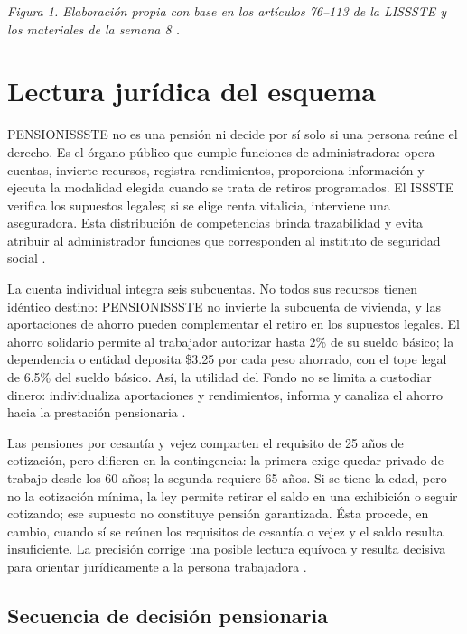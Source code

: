 \documentclass[11pt,letterpaper,oneside]{article}
\begin{document}
\begin{landscape}
\begin{center}
{\scriptsize\textit{Figura 1. Elaboración propia con base en los artículos 76--113 de la LISSSTE y los materiales de la semana 8 \citep{lissste2026,materialS8DSS2026}.}}
\end{center}
\end{landscape}
\restoregeometry
\clearpage

\section{Lectura jurídica del esquema}

PENSIONISSSTE no es una pensión ni decide por sí solo si una persona reúne el derecho. Es el órgano público que cumple funciones de administradora: opera cuentas, invierte recursos, registra rendimientos, proporciona información y ejecuta la modalidad elegida cuando se trata de retiros programados. El ISSSTE verifica los supuestos legales; si se elige renta vitalicia, interviene una aseguradora. Esta distribución de competencias brinda trazabilidad y evita atribuir al administrador funciones que corresponden al instituto de seguridad social \citep{lissste2026,carrilloCastroIssste}.

La cuenta individual integra seis subcuentas. No todos sus recursos tienen idéntico destino: PENSIONISSSTE no invierte la subcuenta de vivienda, y las aportaciones de ahorro pueden complementar el retiro en los supuestos legales. El ahorro solidario permite al trabajador autorizar hasta 2\% de su sueldo básico; la dependencia o entidad deposita \$3.25 por cada peso ahorrado, con el tope legal de 6.5\% del sueldo básico. Así, la utilidad del Fondo no se limita a custodiar dinero: individualiza aportaciones y rendimientos, informa y canaliza el ahorro hacia la prestación pensionaria \citep[arts.~76, 100 y 104--106]{lissste2026}.

Las pensiones por cesantía y vejez comparten el requisito de 25 años de cotización, pero difieren en la contingencia: la primera exige quedar privado de trabajo desde los 60 años; la segunda requiere 65 años. Si se tiene la edad, pero no la cotización mínima, la ley permite retirar el saldo en una exhibición o seguir cotizando; ese supuesto no constituye pensión garantizada. Ésta procede, en cambio, cuando sí se reúnen los requisitos de cesantía o vejez y el saldo resulta insuficiente. La precisión corrige una posible lectura equívoca y resulta decisiva para orientar jurídicamente a la persona trabajadora \citep[arts.~84, 89 y 92--94]{lissste2026}.

\subsection{Secuencia de decisión pensionaria}
\end{document}
